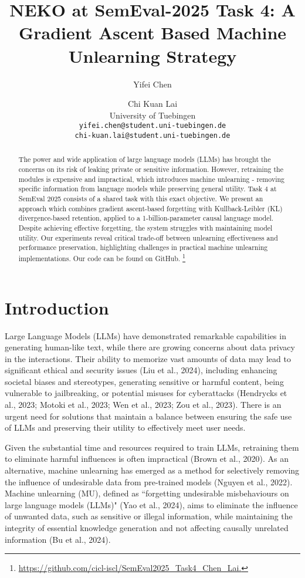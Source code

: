 \documentclass[11pt]{article}
\title{NEKO at SemEval-2025 Task 4: A Gradient Ascent Based Machine Unlearning Strategy}
\author{Yifei Chen \and Chi Kuan Lai \\
  University of Tuebingen \\
  \texttt{yifei.chen@student.uni-tuebingen.de} \\
  \texttt{chi-kuan.lai@student.uni-tuebingen.de} \\}
\begin{document}
\maketitle
\begin{abstract}
The power and wide application of large language models (LLMs) has brought the concerns on its risk of leaking private or sensitive information. However, retraining the modules is expensive and impractical, which introduces machine unlearning - removing specific information from language models while preserving general utility. Task 4 at SemEval 2025 consists of a shared task with this exact objective. We present an approach which combines gradient ascent-based forgetting with Kullback-Leibler (KL) divergence-based retention, applied to a 1-billion-parameter causal language model. Despite achieving effective forgetting, the system struggles with maintaining model utility. Our experiments reveal critical trade-off between unlearning effectiveness and performance preservation, highlighting challenges in practical machine unlearning implementations. Our code can be found on GitHub. \footnote{\url{https://github.com/cicl-iscl/SemEval2025_Task4_Chen_Lai.}}
\end{abstract}

\section{Introduction}

Large Language Models (LLMs) have demonstrated remarkable capabilities in generating human-like text, while there are growing concerns about data privacy in the interactions. Their ability to memorize vast amounts of data may lead to significant ethical and security issues (Liu et al., 2024), including enhancing societal biases and stereotypes, generating sensitive or harmful content, being vulnerable to jailbreaking, or potential misuses for cyberattacks \citep{HendrycksDan2023AOoC} (Hendrycks et al., 2023; Motoki et al., 2023; Wen et al., 2023; Zou et al., 2023). There is an urgent need for solutions that maintain a balance between ensuring the safe use of LLMs and preserving their utility to effectively meet user needs.

Given the substantial time and resources required to train LLMs, retraining them to eliminate harmful influences is often impractical (Brown et al., 2020). As an alternative, machine unlearning has emerged as a method for selectively removing the influence of undesirable data from pre-trained models (Nguyen et al., 2022). Machine unlearning (MU), defined as ``forgetting undesirable misbehaviours on large language models (LLMs)" (Yao et al., 2024), aims to eliminate the influence of unwanted data, such as sensitive or illegal information, while maintaining the integrity of essential knowledge generation and not affecting causally unrelated information (Bu et al., 2024). 
\end{document}
